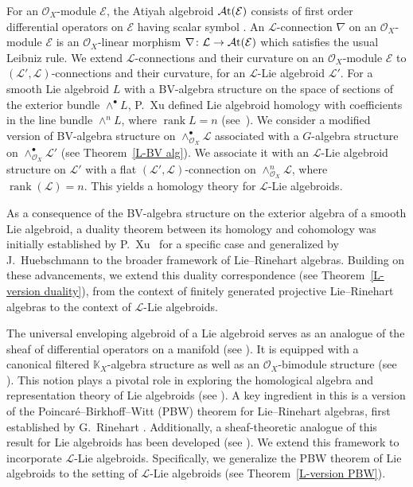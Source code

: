 \documentclass[pdftex]{sigma}
\numberwithin{equation}{section}
\theoremstyle{definition}
\begin{document}
For an $\mathcal{O}_X$-module $\mathcal{E}$, the Atiyah algebroid $\mathcal{A}{\rm t}(\mathcal{E})$ consists of first order differential operators on $\mathcal{E}$ having scalar symbol \cite{UB, MK}.
An $\mathcal{L}$-connection $\nabla$ on an $\mathcal{O}_X$-module $\mathcal{E}$ is an $\mathcal{O}_X$-linear morphism $\nabla\colon \mathcal{L} \rightarrow \mathcal{A}{\rm t}(\mathcal{E})$ which satisfies the usual Leibniz rule.
We extend $\mathcal{L}$-connections and their curvature on an $\mathcal{O}_X$-module $\mathcal{E}$ to $(\mathcal{L}', \mathcal{L})$-connections and their curvature, for an $\mathcal{L}$-Lie algebroid $\mathcal{L}'$.
For a smooth Lie algebroid $L$ with a BV-algebra structure on the space of sections of the exterior bundle $\wedge^\bullet L$, P.~Xu defined Lie algebroid homology with coefficients in the line bundle $\wedge^n L$, where $\operatorname{rank} L=n$ (see~\cite{PX}).
We consider a modified version of BV-algebra structure on $\wedge^\bullet_{\mathcal{O}_X} \mathcal{L}$ associated with a $G$-algebra structure on $\wedge_{\mathcal{O}_X}^{\bullet} \mathcal{L}'$ (see Theorem~\ref{L-BV alg}). We associate it with an $\mathcal{L}$-Lie algebroid structure on $\mathcal{L}'$ with a flat $(\mathcal{L}', \mathcal{L})$-connection
on $\wedge^n_{\mathcal{O}_X} \mathcal{L}$, where $\operatorname{rank}(\mathcal{L})=n$. This yields a homology theory for $\mathcal{L}$-Lie algebroids.

As a consequence of the BV-algebra structure on the exterior algebra of a smooth Lie algebroid, a duality theorem between its homology and cohomology was initially established by P.~Xu~\cite{PX} for a specific case and generalized by J.~Huebschmann \cite{JH1, JH2} to the broader framework of Lie--Rinehart algebras. Building on these advancements, we extend this duality correspondence (see Theorem~\ref{L-version duality}), from the context of finitely generated projective Lie--Rinehart algebras to the context of $\mathcal{L}$-Lie algebroids.

The universal enveloping algebroid of a Lie algebroid serves as an analogue of the sheaf of differential operators on a manifold (see \cite{DRV, AA, SR, TS}). It is equipped with a canonical filtered $\mathbb{K}_X$-algebra structure as well as an $\mathcal{O}_X$-bimodule structure (see \cite{DRV, CV, AA}).
This notion plays a pivotal role in exploring the homological algebra and representation theory of Lie algebroids (see \cite{UB, BRT, BP, AS}). A key ingredient in this is a version of the Poincar\'e--Birkhoff--Witt (PBW) theorem for Lie--Rinehart algebras, first established by G.~Rinehart \cite{GR}. Additionally, a sheaf-theoretic analogue of this result for Lie algebroids has been developed (see \cite{MK, AA, BP, TS}).
We extend this framework to incorporate $\mathcal{L}$-Lie algebroids. Specifically, we generalize the PBW theorem of Lie algebroids to the setting of $\mathcal{L}$-Lie algebroids (see Theorem~\ref{L-version PBW}).
\end{document}
